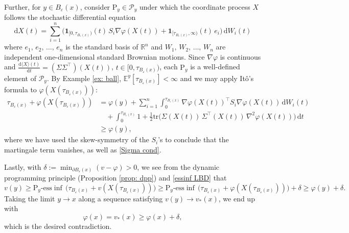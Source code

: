 \documentclass[11pt]{amsart}
\numberwithin{equation}{section}
\begin{document}
Further, for $y\in B_{\varepsilon}(x)$, consider $\mathrm{P}_y \in \mathcal{P}_y$ under which the coordinate process $X$ follows the stochastic differential equation
 \begin{equation}
 \mathrm{d}{X(t)} =\sum_{i=1}^{n} \big(\mathbf{1}_{[0,\tau_{B_\varepsilon(x)})}(t)\, S_i\nabla\varphi(X(t)) + \mathbf{1}_{[\tau_{B_\varepsilon(x)}, \infty)}(t)\, e_i\big)\,\mathrm{d}W_i(t)
\end{equation}
where $e_1,\, e_2,\,\ldots,\, e_n$ is the standard basis of ${\mathbb R}^n$ and $W_1,\,W_2,\,\ldots,\,W_n$ are independent one-dimensional standard Brownian motions. Since $\nabla\varphi$ is continuous and $\frac{\mathrm{d}\langle X\rangle(t)}{\mathrm{d}t}\!=\!(\Sigma\Sigma^{\top})(X(t))$, $t\in[0,\tau_{B_\varepsilon(x)})$, each $\mathrm{P}_y$ is a well-defined element of $\mathcal{P}_y$. By Example \ref{ex: ball}, $\mathbb{E}^y[\tau_{B_\varepsilon(x)}]<\infty$ and we may apply It\^o's formula to $\varphi(X(\tau_{B_\varepsilon(x)}))$:
\begin{equation}\label{essinf LBD}
\begin{split}
\tau_{B_\varepsilon(x)} + \varphi(X(\tau_{B_\varepsilon(x)})) & = \varphi(y) + \sum_{i=1}^n \int_0^{\tau_{B_\varepsilon(x)}}  \nabla\varphi(X(t))^{\top} S_i \nabla\varphi(X(t))\,\mathrm{d} W_i(t) \\
& \quad +\int_0^{\tau_{B_\varepsilon(x)}} 1 + \frac{1}{2} \text{tr}\big(\Sigma(X(t))\,\Sigma^{\top}(X(t))\,\nabla^2\varphi(X(t))\big)\,\mathrm{d}t \\ 
& \ge \varphi(y),
\end{split}
\end{equation}
where we have used the skew-symmetry of the $S_i$'s to conclude that the martingale term vanishes, as well as \eqref{Sigma cond}.

\medskip

Lastly, with $\delta:=\min_{\partial B_\varepsilon(x)} (v-\varphi) > 0$, we see from the dynamic programming principle (Proposition \ref{prop: dpp}) and \eqref{essinf LBD} that
\begin{equation*}
v(y) \geq \mathrm{P}_y \text{-}\mathrm{ess} \inf \,\big(\tau_{B_\varepsilon(x)} + v(X(\tau_{B_\varepsilon(x)}))\big)
\ge \mathrm{P}_y \text{-}\mathrm{ess} \inf \,\big(\tau_{B_\varepsilon(x)} + \varphi(X(\tau_{B_\varepsilon(x)}))\big)+ \delta 
\ge \varphi(y) + \delta .
\end{equation*}
Taking the limit $y\to x$ along a sequence satisfying $v(y)\to v_*(x)$, we end up with 
\begin{equation}
\varphi(x) = v_*(x)\geq  \varphi(x) + \delta, 
\end{equation}
which is the desired contradiction. 
\end{document}
